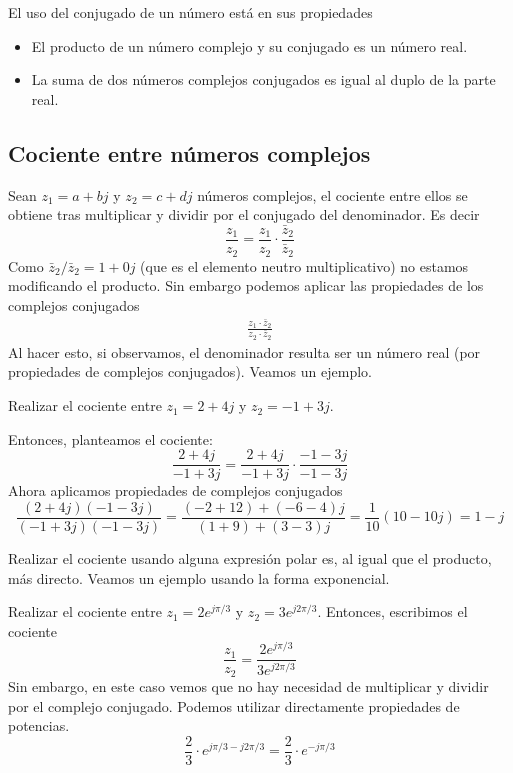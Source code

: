El uso del conjugado de un número está en sus propiedades
\begin{itemize}
  \item El producto de un número complejo y su conjugado es un número real.
  \item La suma de dos números complejos conjugados es igual al duplo de la parte real.
\end{itemize}

\subsection{Cociente entre números complejos}

Sean $z_1=a+bj$ y $z_2=c+dj$ números complejos, el cociente entre ellos se obtiene tras multiplicar y dividir por el conjugado del denominador. Es decir
$$
\frac{z_1}{z_2} = \frac{z_1}{z_2}\cdot \frac{\bar{z}_2}{\bar{z}_2}
$$
Como $\bar{z}_2/\bar{z}_2=1+0j$ (que es el elemento neutro multiplicativo) no estamos modificando el producto. Sin embargo podemos aplicar las propiedades de los complejos conjugados
\begin{align*}
  \frac{z_1\cdot \bar{z}_2}{z_2 \cdot \bar{z}_2}
\end{align*}
Al hacer esto, si observamos, el denominador resulta ser un número real (por propiedades de complejos conjugados). Veamos un ejemplo.
\begin{example}
  Realizar el cociente entre $z_1=2+4j$ y $z_2=-1+3j$. 

  Entonces, planteamos el cociente:
  $$
  \frac{2+4j}{-1+3j} = \frac{2+4j}{-1+3j}\cdot\frac{-1-3j}{-1-3j}
  $$
  Ahora aplicamos propiedades de complejos conjugados
  $$
  \frac{(2+4j)(-1-3j)}{(-1+3j)(-1-3j)}=\frac{(-2+12)+(-6-4)j}{(1+9)+(3-3)j} = \frac{1}{10}(10-10j) = 1-j
  $$
\end{example}

Realizar el cociente usando alguna expresión polar es, al igual que el producto, más directo. Veamos un ejemplo usando la forma exponencial.
\begin{example}
  Realizar el cociente entre $z_1=2e^{j\pi/3}$ y $z_2=3e^{j2\pi/3}$. Entonces, escribimos el cociente
  $$
  \frac{z_1}{z_2}=\frac{2e^{j\pi/3}}{3e^{j2\pi/3}}
  $$
  Sin embargo, en este caso vemos que no hay necesidad de multiplicar y dividir por el complejo conjugado. Podemos utilizar directamente propiedades de potencias.
  $$
  \frac{2}{3}\cdot e^{j\pi/3 - j2\pi/3} = \frac{2}{3}\cdot e^{-j\pi/3}
  $$
\end{example}

